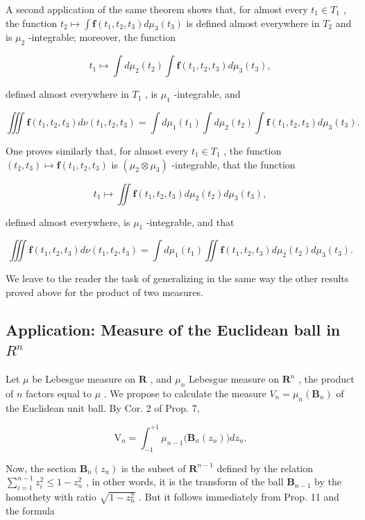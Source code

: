A second application of the same theorem shows that, for almost every \(t_{1} \in T_{1}\) , the function \(t_{2} \mapsto \int \mathbf{f}(t_{1}, t_{2}, t_{3}) d\mu_{3}(t_{3})\) is defined almost everywhere in \(T_{2}\) and is \(\mu_{2}\) -integrable; moreover, the function

\[
t _ {1} \mapsto \int d \mu_ {2} (t _ {2}) \int \mathbf {f} (t _ {1}, t _ {2}, t _ {3}) d \mu_ {3} (t _ {3}),
\]

defined almost everywhere in \(T_{1}\) , is \(\mu_{1}\) -integrable, and

\[
\iiint \mathbf {f} (t _ {1}, t _ {2}, t _ {3}) d \nu (t _ {1}, t _ {2}, t _ {3}) = \int d \mu_ {1} (t _ {1}) \int d \mu_ {2} (t _ {2}) \int \mathbf {f} (t _ {1}, t _ {2}, t _ {3}) d \mu_ {3} (t _ {3}).
\]

One proves similarly that, for almost every \(t_{1} \in T_{1}\) , the function \((t_{2}, t_{3}) \mapsto \mathbf{f}(t_{1}, t_{2}, t_{3})\) is \((\mu_{2} \otimes \mu_{3})\) -integrable, that the function

\[
t _ {1} \mapsto \iint \mathbf {f} (t _ {1}, t _ {2}, t _ {3}) d \mu_ {2} (t _ {2}) d \mu_ {3} (t _ {3}),
\]

defined almost everywhere, is \(\mu_{1}\) -integrable, and that

\[
\iiint \mathbf {f} (t _ {1}, t _ {2}, t _ {3}) d \nu (t _ {1}, t _ {2}, t _ {3}) = \int d \mu_ {1} (t _ {1}) \iint \mathbf {f} (t _ {1}, t _ {2}, t _ {3}) d \mu_ {2} (t _ {2}) d \mu_ {3} (t _ {3}).
\]

We leave to the reader the task of generalizing in the same way the other results proved above for the product of two measures.

\subsection{\texorpdfstring{Application: Measure of the Euclidean ball in \(R^{n}\)}{Application: Measure of the Euclidean ball in R to the n}}

Let \(\mu\) be Lebesgue measure on \(\mathbf{R}\) , and \(\mu_n\) Lebesgue measure on \(\mathbf{R}^n\) , the product of \(n\) factors equal to \(\mu\) . We propose to calculate the measure \(V_n = \mu_n(\mathbf{B}_n)\) of the Euclidean unit ball. By Cor. 2 of Prop. 7,

\[
\mathrm{V} _ {n} = \int_ {- 1} ^ {+ 1} \mu_ {n - 1} \big (\mathbf {B} _ {n} (z _ {n}) \big) d z _ {n}.\tag{16}
\]

Now, the section \(\mathbf{B}_n(z_n)\) is the subset of \(\mathbf{R}^{n-1}\) defined by the relation \(\sum_{i=1}^{n-1} z_i^2 \leqslant 1 - z_n^2\) , in other words, it is the transform of the ball \(\mathbf{B}_{n-1}\) by the homothety with ratio \(\sqrt{1 - z_n^2}\) . But it follows immediately from Prop. 11 and the formula

